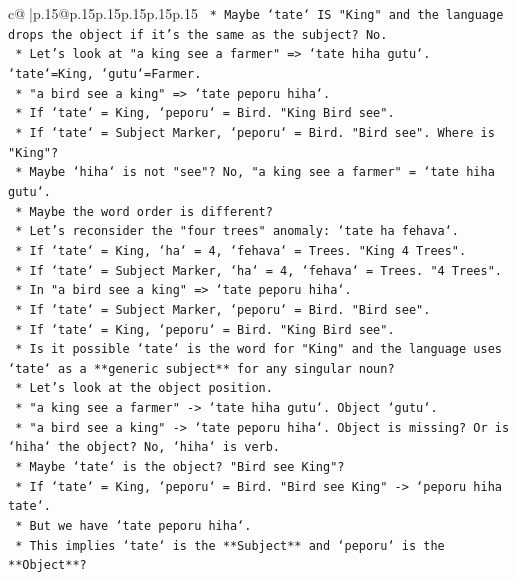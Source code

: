 \documentclass{article}
\begin{document}
{\begin{supertabular}{c@{$\;$}|p{.15\linewidth}@{}p{.15\linewidth}p{.15\linewidth}p{.15\linewidth}p{.15\linewidth}p{.15\linewidth}}
{{{\texttt{    *   Maybe `tate` IS "King" and the language drops the object if it's the same as the subject? No.} \\
\texttt{    *   Let's look at "a king see a farmer" => `tate hiha gutu`. `tate`=King, `gutu`=Farmer.} \\
\texttt{    *   "a bird see a king" => `tate peporu hiha`.} \\
\texttt{    *   If `tate` = King, `peporu` = Bird. "King Bird see".} \\
\texttt{    *   If `tate` = Subject Marker, `peporu` = Bird. "Bird see". Where is "King"?} \\
\texttt{    *   Maybe `hiha` is not "see"? No, "a king see a farmer" = `tate hiha gutu`.} \\
\texttt{    *   Maybe the word order is different?} \\
\texttt{    *   Let's reconsider the "four trees" anomaly: `tate ha fehava`.} \\
\texttt{    *   If `tate` = King, `ha` = 4, `fehava` = Trees. "King 4 Trees".} \\
\texttt{    *   If `tate` = Subject Marker, `ha` = 4, `fehava` = Trees. "4 Trees".} \\
\texttt{    *   In "a bird see a king" => `tate peporu hiha`.} \\
\texttt{    *   If `tate` = Subject Marker, `peporu` = Bird. "Bird see".} \\
\texttt{    *   If `tate` = King, `peporu` = Bird. "King Bird see".} \\
\texttt{    *   Is it possible `tate` is the word for "King" and the language uses `tate` as a **generic subject** for any singular noun?} \\
\texttt{    *   Let's look at the object position.} \\
\texttt{    *   "a king see a farmer" {-}> `tate hiha gutu`. Object `gutu`.} \\
\texttt{    *   "a bird see a king" {-}> `tate peporu hiha`. Object is missing? Or is `hiha` the object? No, `hiha` is verb.} \\
\texttt{    *   Maybe `tate` is the object? "Bird see King"?} \\
\texttt{    *   If `tate` = King, `peporu` = Bird. "Bird see King" {-}> `peporu hiha tate`.} \\
\texttt{    *   But we have `tate peporu hiha`.} \\
\texttt{    *   This implies `tate` is the **Subject** and `peporu` is the **Object**?} \\
}}}
\end{supertabular}}
\end{document}
